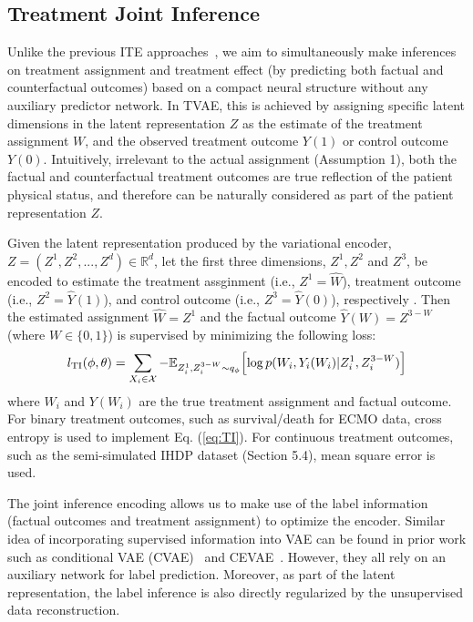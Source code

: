 \subsection{Treatment Joint Inference}
\label{sec:TI}
Unlike the previous ITE approaches~\cite{curth2021st,shalit2017cfrnet,johansson2016bnn,alaa2017dcnpd,shi2019adapting}, we aim to simultaneously make inferences on treatment assignment and treatment effect (by predicting both factual and counterfactual outcomes) based on a compact neural structure without any auxiliary predictor network. In TVAE, this is achieved by assigning specific latent dimensions in the latent representation $Z$ as the estimate of the treatment assignment $W$, and the observed treatment outcome $Y(1)$ or control outcome $Y(0)$.
Intuitively, irrelevant to the actual assignment (Assumption 1), both the factual and counterfactual treatment outcomes are true reflection of the patient physical status, and therefore can be naturally considered as part of the patient representation $Z$.

Given the latent representation produced by the variational encoder, $Z=(Z^1, Z^2, ..., Z^d)\in\mathbb{R}^d$, let the first three dimensions, $Z^1, Z^2$ and $Z^3$, be encoded to estimate the treatment assginment (i.e., $Z^1=\hat{W}$), treatment outcome (i.e., $Z^2=\hat{Y}(1)$), and control outcome (i.e., $Z^3=\hat{Y}(0)$), respectively
. Then the estimated assignment $\hat{W}=Z^1$ and the factual outcome $\hat{Y}(W)=Z^{3-W}$ (where $W\in\{0,1\}$) is supervised by minimizing the following loss:
\begin{align}
\label{eq:TI}
    l_{\text{TI}}(\phi,\theta) = \sum_{X_i \in \mathcal{X}} -\mathbb{E}_{Z_i^1, Z_i^{3-W}\sim q_{\phi}} \Bigl[
    \log p(W_i,Y_i(W_i)|Z_i^1, Z_i^{3-W})\Bigr]
\end{align}
where $W_i$ and $Y(W_i)$ are the true treatment assignment and factual outcome.
For binary treatment outcomes, such as survival/death for ECMO data, cross entropy is used to implement Eq. (\ref{eq:TI}). 
For continuous treatment outcomes, such as the semi-simulated IHDP dataset (Section 5.4), mean square error is used.


The joint inference encoding allows us to make use of the label information (factual outcomes and treatment assignment) to optimize the encoder.
Similar idea of incorporating supervised information into VAE can be found in prior work such as conditional VAE (CVAE)~\cite{NIPS2015_8d55a249} and CEVAE~\cite{louizos2017cevae}.
However, they all rely on an auxiliary network for label prediction. Moreover, as part of the latent representation, the label inference is also directly regularized by the unsupervised data reconstruction.

